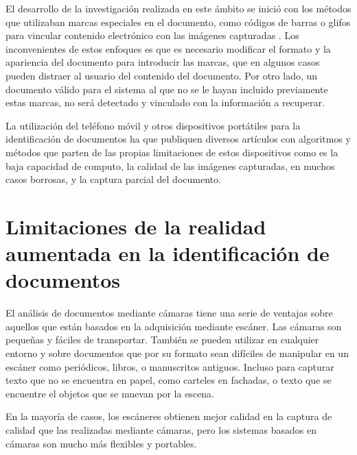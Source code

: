   El desarrollo de la investigación realizada en este ámbito se inició con los métodos que utilizaban marcas especiales en el documento, como códigos de barras \cite{Graham} o glifos para vincular contenido electrónico con las imágenes capturadas \cite{Hecht}. Los inconvenientes de estos enfoques es que es necesario modificar el formato y la apariencia del documento para introducir las marcas, que en algunos casos pueden distraer al usuario del contenido del documento. Por otro lado, un documento válido para el sistema al que no se le hayan incluido previamente estas marcas, no será detectado y vinculado con la información a recuperar.

  La utilización del teléfono móvil y otros dispositivos portátiles para la identificación de documentos ha  que publiquen diversos artículos con algoritmos y métodos que parten de las propias limitaciones de estos dispositivos como es la baja capacidad de computo, la calidad de las imágenes capturadas, en muchos casos borrosas, y la captura parcial del documento.

  \section{Limitaciones de la realidad aumentada en la identificación de documentos}
  El análisis de documentos mediante cámaras tiene una serie de ventajas sobre aquellos que están basados en la adquisición mediante escáner. Las cámaras son pequeñas y fáciles de transportar. También se pueden utilizar en cualquier entorno y sobre documentos que por su formato sean difíciles de manipular en un escáner como periódicos, libros, o manuscritos antiguos. Incluso para capturar texto que no se encuentra en papel, como carteles en fachadas, o texto que se encuentre el objetos que se muevan por la escena.

  En la mayoría de casos, los escáneres obtienen mejor calidad en la captura de calidad que las realizadas mediante cámaras, pero los sistemas basados en cámaras son mucho más flexibles y portables. 

